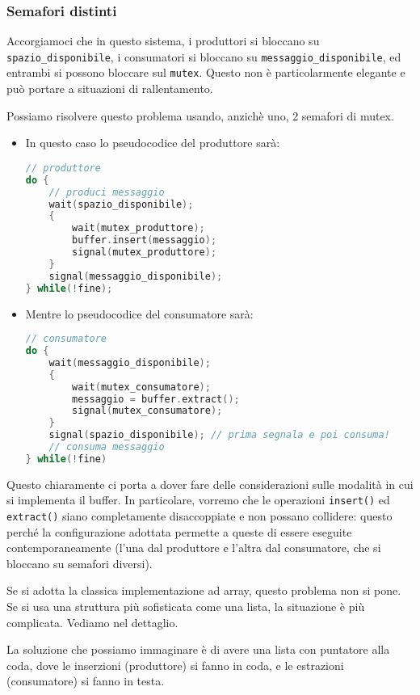 \documentclass[a4paper,11pt]{article}
\begin{document}
\subsubsection{Semafori distinti}
Accorgiamoci che in questo sistema, i produttori si bloccano su \lstinline|spazio_disponibile|, i consumatori si bloccano su \lstinline|messaggio_disponibile|, ed entrambi si possono bloccare sul \lstinline|mutex|. Questo non è particolarmente elegante e può portare a situazioni di rallentamento.

Possiamo risolvere questo problema usando, anzichè uno, 2 semafori di mutex.
\begin{itemize}
	\item 
In questo caso lo pseudocodice del produttore sarà:
\begin{lstlisting}[language=C++, style=codestyle]	
// produttore
do {
	// produci messaggio
	wait(spazio_disponibile);
	{
		wait(mutex_produttore);
		buffer.insert(messaggio);
		signal(mutex_produttore);
	}
	signal(messaggio_disponibile);
} while(!fine);
\end{lstlisting}
	\item
Mentre lo pseudocodice del consumatore sarà:
\begin{lstlisting}[language=C++, style=codestyle]	
// consumatore
do {
	wait(messaggio_disponibile);
	{
		wait(mutex_consumatore);
		messaggio = buffer.extract();
		signal(mutex_consumatore);
	}
	signal(spazio_disponibile); // prima segnala e poi consuma!
	// consuma messaggio
} while(!fine)
\end{lstlisting}
\end{itemize}

\par\smallskip

Questo chiaramente ci porta a dover fare delle considerazioni sulle modalità in cui si implementa il buffer.
In particolare, vorremo che le operazioni \lstinline|insert()| ed \lstinline|extract()| siano completamente disaccoppiate e non possano collidere: questo perché la configurazione adottata permette a queste di essere eseguite contemporaneamente (l'una dal produttore e l'altra dal consumatore, che si bloccano su semafori diversi).

Se si adotta la classica implementazione ad array, questo problema non si pone. Se si usa una struttura più sofisticata come una lista, la situazione è più complicata. Vediamo nel dettaglio.

La soluzione che possiamo immaginare è di avere una lista con puntatore alla coda, dove le inserzioni (produttore) si fanno in coda, e le estrazioni (consumatore) si fanno in testa.
\end{document}
